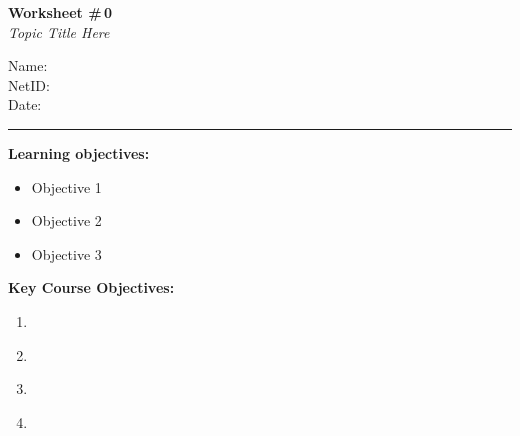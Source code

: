 \documentclass[11pt]{article}
\begin{document}
\noindent
\begin{minipage}[t]{0.55\textwidth}
  \vspace{0pt}
  {\LARGE \textbf{Worksheet \#\,0}} \\[0.3em]
  {\large \textit{Topic Title Here}}
\end{minipage}
\hfill
\begin{minipage}[t]{0.40\textwidth}
  \vspace{0pt}
  \begin{mdframed}[linecolor=black, linewidth=1pt, innertopmargin=10pt, innerbottommargin=10pt]
    \small
    \vspace{0.4cm}
    Name: \underline{\hspace{4.5cm}} \\[1em]
    NetID: \underline{\hspace{4.3cm}} \\[1em]
    Date: \underline{\hspace{4.4cm}} \\
  \end{mdframed}
\end{minipage}

\vspace{1em}
\noindent\rule{\linewidth}{1pt}
\vspace{0.2em}

\noindent\textbf{Learning objectives:}
\begin{itemize}[noitemsep]
  \item Objective 1
  \item Objective 2
  \item Objective 3
\end{itemize}

\vspace{0.8em}


\noindent\textbf{Key Course Objectives:}
\begin{enumerate}[label=$\square$, leftmargin=1.2cm]
  \item \underline{\hspace{12cm}}
  \item \underline{\hspace{12cm}}
  \item \underline{\hspace{12cm}}
  \item \underline{\hspace{12cm}}
\end{enumerate}
\end{document}
